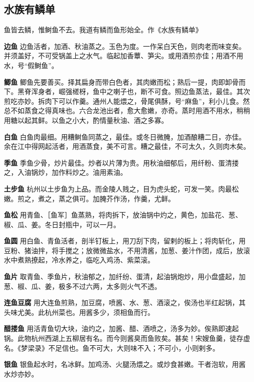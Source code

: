 \documentclass[]{article}
\begin{document}
\hypertarget{header-n23}{%
\subsection{水族有鳞单}\label{header-n23}}

鱼皆去鳞，惟鲥鱼不去。我道有鳞而鱼形始全。作《水族有鳞单》

\textbf{边鱼}
边鱼活者，加酒、秋油蒸之。玉色为度。一作呆白天色，则肉老而味变矣。并须盖好，不可受锅盖上之水气。临起加香蕈、笋尖。或用酒煎亦佳；用酒不用水，号``假鲥鱼''。

\textbf{鲫鱼}
鲫鱼先要善买。择其扁身而带白色者，其肉嫩而松；熟后一提，肉即卸骨而下。黑脊浑身者，崛强槎枒，鱼中之喇子也，断不可食。照边鱼蒸法，最佳。其次煎吃亦妙。拆肉下可以作羹。通州人能煨之，骨尾俱酥，号``麻鱼''，利小儿食。然总不如蒸食之得真味也。六合龙池出者，愈大愈嫩，亦奇。蒸时用酒不用水，稍稍用糖以起其鲜。以鱼之小大，酌情量秋油、酒之多寡。

\textbf{白鱼}
白鱼肉最细。用糟鲥鱼同蒸之，最佳。或冬日微腌，加酒酿糟二日，亦佳。余在江中得网起活者，用酒蒸食，美不可言。糟之最佳，不可太久，久则肉木矣。

\textbf{季鱼}
季鱼少骨，炒片最佳。炒者以片薄为贵。用秋油细郁后，用纤粉、蛋清搂之，入油锅炒，加作料炒之。油用素油。

\textbf{土步鱼}
杭州以土步鱼为上品。而金陵人贱之，目为虎头蛇，可发一笑。肉最松嫩。煎之，煮之，蒸之俱可。加腌芥作汤，作羹，尤鲜。

\textbf{鱼松}
用青鱼、［鱼军］鱼蒸熟，将肉拆下，放油锅中灼之，黄色，加盐花、葱、椒、瓜、姜。冬日封瓶中，可以一月。

\textbf{鱼圆}
用白鱼、青鱼活者，剖半钉板上，用刀刮下肉，留剌的板上；将肉斩化，用豆粉、猪油拌，将手搅之；放微微盐水，不用清酱，加葱、姜汁作团，成后，放滚水中煮熟撩起，冷水养之，临吃入鸡汤、紫菜滚。

\textbf{鱼片}
取青鱼、季鱼片，秋油郁之，加纤纷、蛋清，起油锅炮炒，用小盘盛起，加葱、椒、瓜、姜，极多不过六两，太多则火气不透。

\textbf{连鱼豆腐}
用大连鱼煎熟，加豆腐，喷酱、水、葱、酒滚之，俟汤也半红起锅，其头味尤美。此杭州菜也。用酱多少，须相鱼而行。

\textbf{醋搂鱼}
用活青鱼切大块，油灼之，加酱、醋、酒喷之，汤多为妙。俟熟即速起锅。此物杭州西湖上五柳居有名。而今则酱臭而鱼败矣。甚矣！宋嫂鱼羹，徒存虚名。《梦梁录》不足信也。鱼不可大，大则味不入；不可小，小则剌多。

\textbf{银鱼}
银鱼起水时，名冰鲜。加鸡汤、火腿汤煨之。或炒食甚嫩。干者泡软，用酱水炒亦妙。
\end{document}

